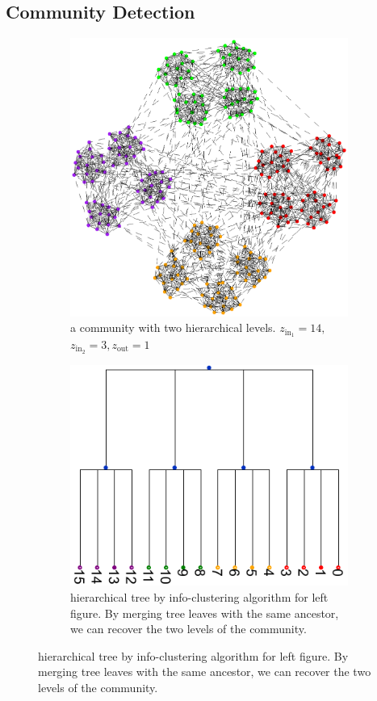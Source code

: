 \documentclass{article}
\begin{document}
\subsection{Community Detection}
\begin{figure}
	\centering
	\begin{subfigure}{0.45\textwidth}
		\includegraphics[width=\textwidth]{pic/two_level.eps}
		\caption{a community with two hierarchical levels. $z_{\mathrm{in}_1} = 14,$ $z_{\mathrm{in}_2} = 3, z_{\mathrm{out}}=1$}\label{fig:c1}
	\end{subfigure}
	\begin{subfigure}{0.45\textwidth}
		\includegraphics[width=\textwidth]{pic/tree_info-clustering.pdf}
		\caption{hierarchical tree by info-clustering algorithm for left figure. By merging tree leaves with the same ancestor, we can recover the two levels of the community.}\label{fig:c2}
	\end{subfigure}
\end{figure}
\end{document}
